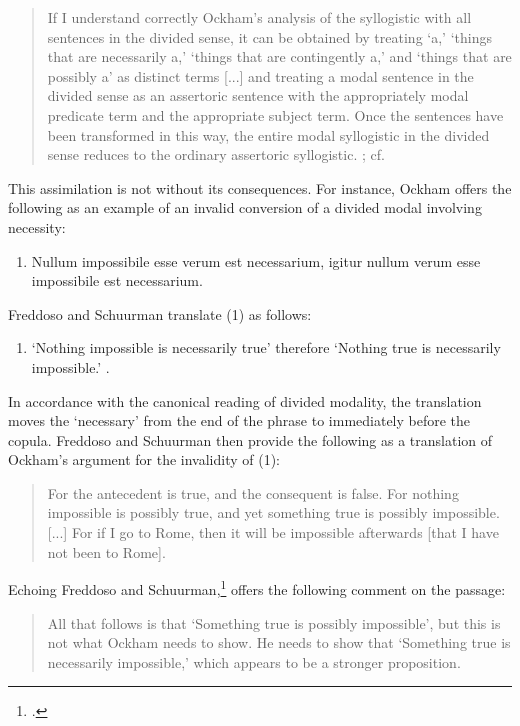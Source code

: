 	\begin{quote}
		If I understand correctly Ockham's analysis of the syllogistic with all sentences in the divided sense, it can be obtained by treating `a,' `things that are necessarily a,' `things that are contingently a,' and `things that are possibly a' as distinct terms [...] and treating a modal sentence in the divided sense as an assertoric sentence with the appropriately modal predicate term and the appropriate subject term. Once the sentences have been transformed in this way, the entire modal syllogistic in the divided sense reduces to the ordinary assertoric syllogistic. \cite[p. 49]{Normore1999}; cf. \cite{DutilhNovaes2004}
	\end{quote}
	
	This assimilation is not without its consequences. For instance, Ockham offers the following as an example of an invalid conversion of a divided modal involving necessity: 
	\begin{enumerate} 
		\item[(1)] Nullum impossibile esse verum est necessarium, igitur nullum verum esse impossibile est necessarium. \cite[II. 24, p. 329]{OckhamSL}
	\end{enumerate}
	
	\noindent Freddoso and Schuurman translate (1) as follows:
	\begin{enumerate}
		\item[(1')]	`Nothing impossible is necessarily true' therefore `Nothing true is necessarily impossible.' \cite[p. 166]{OckhamSLEng}.
	\end{enumerate}
	
	\noindent In accordance with the canonical reading of divided modality, the translation moves the `necessary' from the end of the phrase to immediately before the copula. Freddoso and Schuurman then provide the following as a translation of Ockham's argument for the invalidity of (1):
	\begin{quote}
		For the antecedent is true, and the consequent is false. For nothing impossible is possibly true, and yet something true is possibly impossible. [...] For if I go to Rome, then it will be impossible afterwards [that I have not been to Rome]. \cite[p. 166]{OckhamSLEng}
	\end{quote}
	
	Echoing Freddoso and Schuurman,\footnote{\cite[p. 203, fn. 4]{OckhamSLEng}.} \cite{Johnston2015} offers the following comment on the passage: 
	
	\begin{quote}
		All that follows is that `Something true is possibly impossible', but this is not what Ockham needs to show. He needs to show that `Something true is necessarily impossible,' which appears to be a stronger proposition.  \cite[p. 243]{Johnston2015}
	\end{quote}
	
